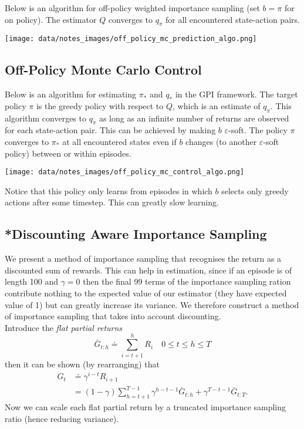 Below is an algorithm for off-policy weighted importance sampling (set $b=\pi$ for on policy). The estimator $Q$ converges to $q_\pi$ for all encountered state-action pairs.

\texttt{[image: data/notes\_images/off\_policy\_mc\_prediction\_algo.png]}


\subsection{Off-Policy Monte Carlo Control}
Below is an algorithm for estimating $\pi_*$ and $q_*$ in the GPI framework. The target policy $\pi$ is the greedy policy with respect to $Q$, which is an estimate of $q_\pi$. This algorithm converges to $q_\pi$ as long as an infinite number of returns are observed for each state-action pair. This can be achieved by making $b$ $\varepsilon$-soft. The policy $\pi$ converges to $\pi_*$ at all encountered states even if $b$ changes (to another $\varepsilon$-soft policy) between or within episodes.

\texttt{[image: data/notes\_images/off\_policy\_mc\_control\_algo.png]}

Notice that this policy only learns from episodes in which $b$ selects only greedy actions after some timestep. This can greatly slow learning.

\subsection{*Discounting Aware Importance Sampling}
We present a method of importance sampling that recognises the return as a discounted sum of rewards. This can help in estimation, since if an episode is of length 100 and $\gamma = 0$ then the final 99 terms of the importance sampling ration contribute nothing to the expected value of our estimator (they have expected value of 1) but can greatly increase its variance. We therefore construct a method of importance sampling that takes into account discounting.\\

Introduce the \emph{flat partial returns}
\[
    \bar{G}_{t:h} \doteq \sum_{i=t+1}^h R_{i} \quad 0 \leq t \leq h \leq T
\]
then it can be shown (by rearranging) that
\begin{align}
    G_t &\doteq \gamma^{i-t}R_{i+1}\\
        &= (1 - \gamma)\sum_{h=t+1}^{T-1}\gamma^{h-t-1}\bar{G}_{t:h} + \gamma^{T-t-1}\bar{G}_{t:T}.
\end{align}
Now we can scale each flat partial return by a truncated importance sampling ratio (hence reducing variance).\\

